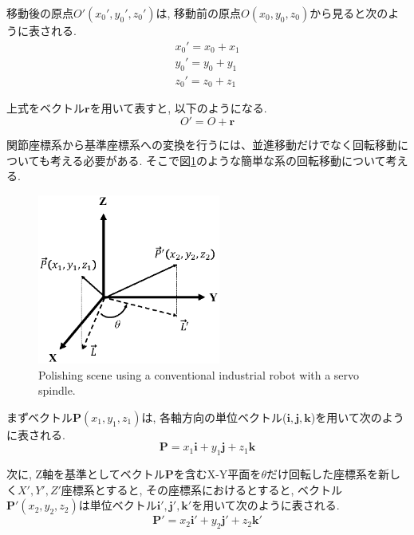 \documentclass{suribt}
\begin{document}
移動後の原点$O'(x_0', y_0', z_0')$は, 移動前の原点$O(x_0, y_0, z_0)$から見ると次のように表される.
\begin{eqnarray*}
	x_0' = x_0 + x_1 \\
	y_0' = y_0 + y_1 \\
	z_0' = z_0 + z_1
\end{eqnarray*}

上式をベクトル${\bm r}$を用いて表すと, 以下のようになる.
\begin{equation}
	\label{O-O'translation}
	O' = O + {\bm r}
\end{equation}

関節座標系から基準座標系への変換を行うには、並進移動だけでなく回転移動についても考える必要がある. そこで図\ref{fig:1rink}のような簡単な系の回転移動について考える.
\begin{figure}[ht]
 \begin{center}
  \includegraphics[width=60mm,clip]{./figure/1rink.eps}
  \caption{Polishing scene using a conventional industrial robot with a servo spindle.}
  \label{fig:1rink}
 \end{center}
\end{figure}

 まずベクトル${\bm P}(x_1, y_1, z_1)$は, 各軸方向の単位ベクトル(${\bm i}, {\bm j}, {\bm k}$)を用いて次のように表される.
\begin{equation}
	\label{Pvector}
	{\bm P} = x_1{\bm i} + y_1{\bm j} + z_1{\bm k}
\end{equation}

次に, Z軸を基準としてベクトル${\bm P}$を含むX-Y平面を$\theta$だけ回転した座標系を新しく$X', Y', Z'$座標系とすると, その座標系におけるとすると, ベクトル${\bm P'}(x_2, y_2, z_2)$は単位ベクトル${\bm i'}, {\bm j'}, {\bm k'}$を用いて次のように表される.
\begin{equation}
	\label{P'vector}
	{\bm P'} = x_2{\bm i'} + y_2{\bm j'} + z_2{\bm k'}
\end{equation}
\end{document}

